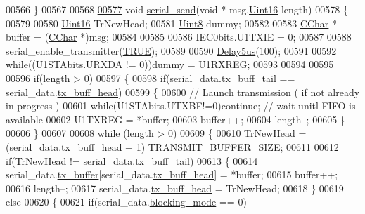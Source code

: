 \begin{DoxyCode}
{{{{{{00566 \}
00567 
00568 
\hypertarget{a00030_source_l00577}{}\hyperlink{a00030_a17f65cf9dbacdfb97cb2536ed0097ccb}{00577} \textcolor{keywordtype}{void}  \hyperlink{a00030_a17f65cf9dbacdfb97cb2536ed0097ccb}{serial\_send}(\textcolor{keywordtype}{void} * msg,\hyperlink{a00072_a59a9f6be4562c327cbfb4f7e8e18f08b}{Uint16} length)
00578 \{
00579   
00580     \hyperlink{a00072_a59a9f6be4562c327cbfb4f7e8e18f08b}{Uint16} TrNewHead;
00581     \hyperlink{a00072_af84840501dec18061d18a68c162a8fa2}{Uint8}  dummy;
00582 
00583     \hyperlink{a00072_ab151ad5c5a3b673cb8815c87ed7f706c}{CChar} * buffer = (\hyperlink{a00072_ab151ad5c5a3b673cb8815c87ed7f706c}{CChar} *)msg;
00584 
00585 
00586     IEC0bits.U1TXIE    = 0;
00587 
00588     serial\_enable\_transmitter(\hyperlink{a00040_aa8cecfc5c5c054d2875c03e77b7be15d}{TRUE});
00589 
00590     \hyperlink{a00033_a3b0017f6ec0e04a6435bba00fe325294}{Delay5us}(100);
00591     
00592     \textcolor{keywordflow}{while}((U1STAbits.URXDA != 0))dummy = U1RXREG;
00593     
00594 
00595 
00596     \textcolor{keywordflow}{if}(length > 0)
00597     \{
00598         \textcolor{keywordflow}{if}(serial\_data.\hyperlink{a00030_a6287e1447d7902b8bbc2f6359065dcbd}{tx\_buff\_tail} == serial\_data.\hyperlink{a00030_a3e2eda0a020422511de91b2bc7386083}{tx\_buff\_head})
00599         \{
00600             \textcolor{comment}{// Launch transmission ( if not already in progress )}
00601             \textcolor{keywordflow}{while}(U1STAbits.UTXBF!=0)\textcolor{keywordflow}{continue}; \textcolor{comment}{// wait unitl FIFO is available}
00602             U1TXREG = *buffer;
00603             buffer++;
00604             length--;
00605         \}
00606     \}
00607 
00608     \textcolor{keywordflow}{while} (length > 0)
00609     \{
00610         TrNewHead = (serial\_data.\hyperlink{a00030_a3e2eda0a020422511de91b2bc7386083}{tx\_buff\_head} + 1)%
      \hyperlink{a00031_aef714b16a48390956c10e8aa18d156b8}{TRANSMIT\_BUFFER\_SIZE};
00611 
00612         \textcolor{keywordflow}{if}(TrNewHead != serial\_data.\hyperlink{a00030_a6287e1447d7902b8bbc2f6359065dcbd}{tx\_buff\_tail})
00613         \{
00614             serial\_data.\hyperlink{a00030_a327864d2719b5145f0eded883fe321c5}{tx\_buffer}[serial\_data.\hyperlink{a00030_a3e2eda0a020422511de91b2bc7386083}{tx\_buff\_head}] = *buffer;
00615             buffer++;
00616             length--;
00617             serial\_data.\hyperlink{a00030_a3e2eda0a020422511de91b2bc7386083}{tx\_buff\_head} = TrNewHead;
00618         \}
00619         \textcolor{keywordflow}{else}
00620         \{
00621             \textcolor{keywordflow}{if}(serial\_data.\hyperlink{a00030_a758ac775caab1899af08024d4635f7e3}{blocking\_mode} == 0)
}}}}}}
\end{DoxyCode}
